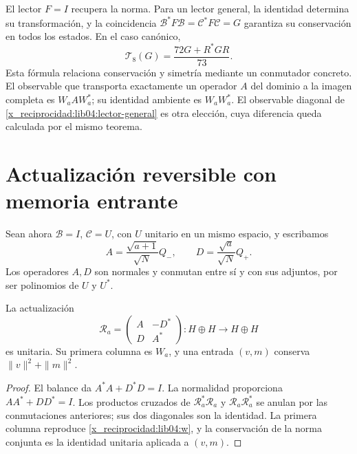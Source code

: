 El lector \(F=I\) recupera la norma. Para un lector general, la
identidad determina su transformación, y la coincidencia
\(\mathcal B^*F\mathcal B=\mathcal C^*F\mathcal C=G\) garantiza
su conservación en todos los estados. En el caso canónico,
\begin{equation}
 \mathcal T_8(G)=\frac{72G+R^*GR}{73}.
 \label{x_reciprocidad:lib04:lector-72}
\end{equation}
Esta fórmula relaciona conservación y simetría mediante un conmutador
concreto. El observable que transporta exactamente un operador
\(A\) del dominio a la imagen completa es \(W_aAW_a^*\); su
identidad ambiente es \(W_aW_a^*\). El observable diagonal de
\eqref{x_reciprocidad:lib04:lector-general} es otra elección, cuya diferencia queda
calculada por el mismo teorema.

\section{Actualización reversible con memoria entrante}
\label{x_reciprocidad:lib04:reentrada}

Sean ahora \(\mathcal B=I\), \(\mathcal C=U\), con \(U\)
unitario en un mismo espacio, y escribamos
\begin{equation}
 A=\frac{\sqrt{a+1}}{\sqrt N}Q_-,\qquad
 D=\frac{\sqrt a}{\sqrt N}Q_+.
 \label{x_reciprocidad:lib04:ad}
\end{equation}
Los operadores \(A,D\) son normales y conmutan entre sí y con sus
adjuntos, por ser polinomios de \(U\) y \(U^*\).

\begin{theorem}
\label{x_reciprocidad:lib04:teo-unitaria}
La actualización
\begin{equation}
 \mathscr R_a=
 \begin{pmatrix}A&-D^*\\D&A^*\end{pmatrix}:H\oplus H\to H\oplus H
 \label{x_reciprocidad:lib04:unitaria}
\end{equation}
es unitaria. Su primera columna es \(W_a\), y una entrada
\((v,m)\) conserva \(\|v\|^2+\|m\|^2\).
\end{theorem}

\begin{proof}
El balance da \(A^*A+D^*D=I\). La normalidad proporciona
\(AA^*+DD^*=I\). Los productos cruzados de
\(\mathscr R_a^*\mathscr R_a\) y
\(\mathscr R_a\mathscr R_a^*\) se anulan por las conmutaciones
anteriores; sus dos diagonales son la identidad. La primera columna
reproduce \eqref{x_reciprocidad:lib04:w}, y la conservación de la norma conjunta
es la identidad unitaria aplicada a \((v,m)\).
\end{proof}

